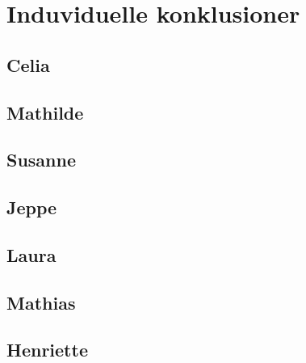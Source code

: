 \chapter{Induviduelle konklusioner}

\section{Celia}

\section{Mathilde}

\section{Susanne}

\section{Jeppe}

\section{Laura}

\section{Mathias}

\section{Henriette}
